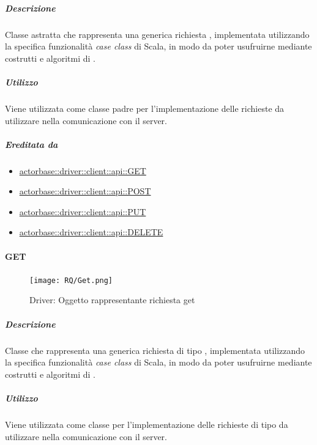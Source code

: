 \documentclass{scalatekids-article}
\begin{document}
\subparagraph{Descrizione}

Classe astratta che rappresenta una generica richiesta ,
implementata utilizzando la specifica funzionalità \textit{case class} di Scala,
in modo da poter usufruirne mediante costrutti e algoritmi di .

\subparagraph{Utilizzo}

Viene utilizzata come classe padre per l'implementazione delle richieste
 da utilizzare nella comunicazione con il server.

\subparagraph{Ereditata da}

\begin{itemize}
\item \hyperref[sec:actorbase::driver::client::api::GET]{actorbase::driver::client::api::GET}
\item \hyperref[sec:actorbase::driver::client::api::POST]{actorbase::driver::client::api::POST}
\item \hyperref[sec:actorbase::driver::client::api::PUT]{actorbase::driver::client::api::PUT}
\item \hyperref[sec:actorbase::driver::client::api::DELETE]{actorbase::driver::client::api::DELETE}
\end{itemize}


\paragraph{GET}
\label{sec:actorbase::driver::client::api::GET}

\begin{figure}[H]
  \begin{center}
    \texttt{[image: RQ/Get.png]}
    \caption{Driver: Oggetto rappresentante richiesta get}
  \end{center}
\end{figure}

\subparagraph{Descrizione}

Classe che rappresenta una generica richiesta  di tipo
, implementata utilizzando la specifica funzionalità \textit{case
  class} di Scala, in modo da poter usufruirne mediante costrutti e algoritmi di
.

\subparagraph{Utilizzo}

Viene utilizzata come classe per l'implementazione delle richieste 
di tipo  da utilizzare nella comunicazione con il server.
\end{document}
